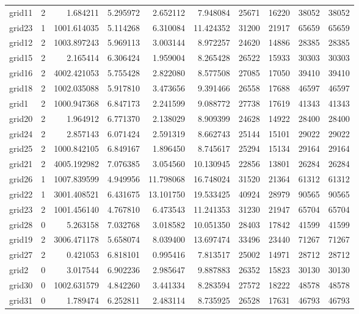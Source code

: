 \begin{longtable}{|l|r|r|r|r|r|r|r|r|r|}
grid11 & 2 & 1.684211 & 5.295972 & 2.652112 & 7.948084 & 25671 & 16220 & 38052 & 38052 \\
grid23 & 1 & 1001.614035 & 5.114268 & 6.310084 & 11.424352 & 31200 & 21917 & 65659 & 65659 \\
grid12 & 2 & 1003.897243 & 5.969113 & 3.003144 & 8.972257 & 24620 & 14886 & 28385 & 28385 \\
grid15 & 2 & 2.165414 & 6.306424 & 1.959004 & 8.265428 & 26522 & 15933 & 30303 & 30303 \\
grid16 & 2 & 4002.421053 & 5.755428 & 2.822080 & 8.577508 & 27085 & 17050 & 39410 & 39410 \\
grid18 & 2 & 1002.035088 & 5.917810 & 3.473656 & 9.391466 & 26558 & 17688 & 46597 & 46597 \\
grid1 & 2 & 1000.947368 & 6.847173 & 2.241599 & 9.088772 & 27738 & 17619 & 41343 & 41343 \\
grid20 & 2 & 1.964912 & 6.771370 & 2.138029 & 8.909399 & 24628 & 14922 & 28400 & 28400 \\
grid24 & 2 & 2.857143 & 6.071424 & 2.591319 & 8.662743 & 25144 & 15101 & 29022 & 29022 \\
grid25 & 2 & 1000.842105 & 6.849167 & 1.896450 & 8.745617 & 25294 & 15134 & 29164 & 29164 \\
grid21 & 2 & 4005.192982 & 7.076385 & 3.054560 & 10.130945 & 22856 & 13801 & 26284 & 26284 \\
grid26 & 1 & 1007.839599 & 4.949956 & 11.798068 & 16.748024 & 31520 & 21364 & 61312 & 61312 \\
grid22 & 1 & 3001.408521 & 6.431675 & 13.101750 & 19.533425 & 40924 & 28979 & 90565 & 90565 \\
grid23 & 2 & 1001.456140 & 4.767810 & 6.473543 & 11.241353 & 31230 & 21947 & 65704 & 65704 \\
grid28 & 0 & 5.263158 & 7.032768 & 3.018582 & 10.051350 & 28403 & 17842 & 41599 & 41599 \\
grid19 & 2 & 3006.471178 & 5.658074 & 8.039400 & 13.697474 & 33496 & 23440 & 71267 & 71267 \\
grid27 & 2 & 0.421053 & 6.818101 & 0.995416 & 7.813517 & 25002 & 14971 & 28712 & 28712 \\
grid2 & 0 & 3.017544 & 6.902236 & 2.985647 & 9.887883 & 26352 & 15823 & 30130 & 30130 \\
grid30 & 0 & 1002.631579 & 4.842260 & 3.441334 & 8.283594 & 27572 & 18222 & 48578 & 48578 \\
grid31 & 0 & 1.789474 & 6.252811 & 2.483114 & 8.735925 & 26528 & 17631 & 46793 & 46793 \\

\end{longtable}
